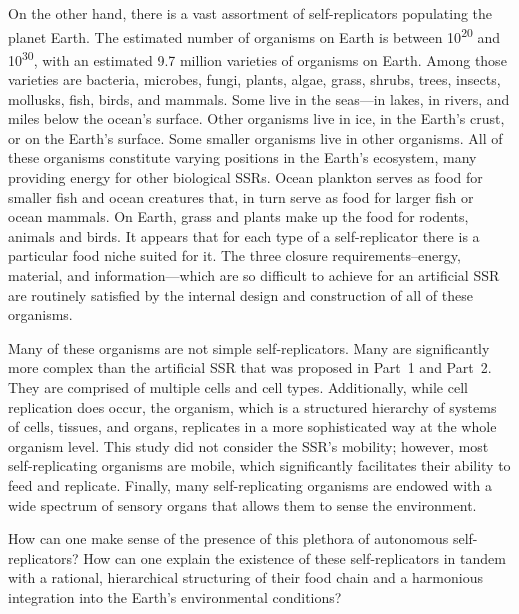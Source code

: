 On the other hand, there is a vast assortment of
self-replicators populating the planet Earth. The estimated number of
organisms on Earth is between 10\textsuperscript{20} and
10\textsuperscript{30}, with an estimated 9.7 million varieties of
organisms on Earth. Among those varieties are bacteria, microbes,
fungi, plants, algae, grass, shrubs, trees, insects, mollusks, fish,
birds, and mammals. Some live in the seas---in 
lakes,  in rivers, and miles below the ocean's surface. Other
organisms live in ice, in the Earth’s crust, or on the Earth’s surface.
Some smaller organisms live in other organisms. 
All of these organisms constitute varying positions in the Earth's ecosystem, 
many providing energy for other biological SSRs.
Ocean
plankton serves as food for smaller fish and ocean creatures that, in
turn serve as food for larger fish or ocean mammals. On Earth, grass
and plants make up the food for rodents, animals and birds. It appears
that for each type of a self-replicator there is a particular food
niche suited for it. 
The three closure requirements--energy, material, and information---which 
are so difficult to achieve for an artificial SSR are routinely satisfied 
by the internal design and construction of all of these organisms.

Many of these organisms are not simple self-replicators. Many are significantly more complex than the artificial SSR  that was proposed in Part~1 and Part~2. They are comprised of multiple cells and cell types. Additionally, while cell replication does occur, the organism, which is a structured hierarchy of systems of cells, tissues, and organs, replicates in a more sophisticated way at the whole organism level. This study did not consider the SSR’s mobility; however, most self-replicating organisms are mobile, which significantly facilitates their ability to feed and replicate. Finally, many self-replicating organisms are endowed with a wide spectrum of sensory organs that allows them to sense the environment.

How can one make sense of the presence of this plethora of
autonomous self-replicators? How can one explain the
existence of these self-replicators in tandem with a rational, hierarchical
structuring of their food chain and a harmonious integration into the
Earth’s environmental conditions?

